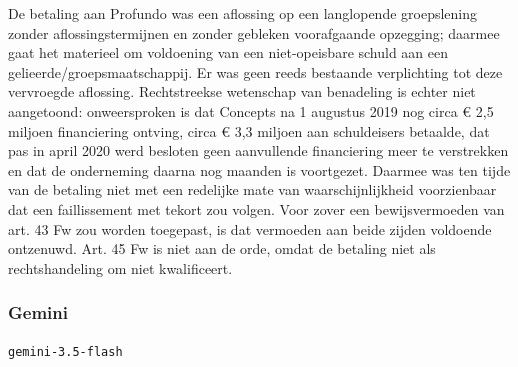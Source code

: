 \documentclass[
  dutch,
  a4paper,
]{article}
\begin{document}
De betaling aan Profundo was een aflossing op een langlopende groepslening zonder aflossingstermijnen en zonder gebleken voorafgaande opzegging; daarmee gaat het materieel om voldoening van een niet-opeisbare schuld aan een gelieerde/groepsmaatschappij. Er was geen reeds bestaande verplichting tot deze vervroegde aflossing. Rechtstreekse wetenschap van benadeling is echter niet aangetoond: onweersproken is dat Concepts na 1 augustus 2019 nog circa € 2,5 miljoen financiering ontving, circa € 3,3 miljoen aan schuldeisers betaalde, dat pas in april 2020 werd besloten geen aanvullende financiering meer te verstrekken en dat de onderneming daarna nog maanden is voortgezet. Daarmee was ten tijde van de betaling niet met een redelijke mate van waarschijnlijkheid voorzienbaar dat een faillissement met tekort zou volgen. Voor zover een bewijsvermoeden van art. 43 Fw zou worden toegepast, is dat vermoeden aan beide zijden voldoende ontzenuwd. Art. 45 Fw is niet aan de orde, omdat de betaling niet als rechtshandeling om niet kwalificeert.

\newpage


\subsubsection{Gemini}\label{gemini-14}

\texttt{gemini-3.5-flash}
\end{document}
